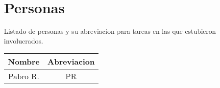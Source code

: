 \documentclass{article}
\begin{document}
\section{Personas}
Listado de personas y su abreviacion para tareas en las que estubieron involucrados.
\begin{table}[htbp]
    \centering
    \begin{tabular}{|c|c|}
        \hline
        \textbf{Nombre} & \textbf{Abreviacion} \\ \hline
        Pabro R. & \label{P1} PR \\ \hline
    \end{tabular}
\end{table}
\end{document}
